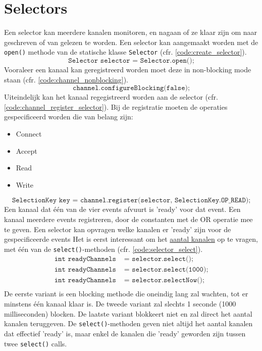 \documentclass{report}
\begin{document}
\section{Selectors}
Een selector kan meerdere kanalen monitoren, en nagaan of ze klaar zijn om naar geschreven of van gelezen te worden. Een selector kan aangemaakt worden met de \texttt{open()} methode van de statische klasse \texttt{Selector} (cfr. \ref{code:create_selector}).
\begin{equation}
	\texttt{Selector selector = Selector.open();}
	\label{code:create_selector}
\end{equation}
Vooraleer een kanaal kan geregistreerd worden moet deze in non-blocking mode staan (cfr. \ref{code:channel_nonblocking}).
\begin{equation}
	\texttt{channel.configureBlocking(false);}
	\label{code:channel_nonblocking}
\end{equation}
Uiteindelijk kan het kanaal regegistreerd worden aan de selector (cfr. \ref{code:channel_register_selector}). Bij de registratie moeten de operaties gespecificeerd worden die van belang zijn:
\begin{itemize}
	\item Connect
	\item Accept
	\item Read
	\item Write
\end{itemize}
\begin{equation}
	\texttt{SelectionKey key = channel.register(selector, SelectionKey.OP\_READ);}
	\label{code:channel_register_selector}
\end{equation}
Een kanaal dat één van de vier events afvuurt is 'ready' voor dat event. Een kanaal meerdere events registreren, door de constanten met de OR operatie mee te geven.
Een selector kan opvragen welke kanalen er 'ready' zijn voor de gespecificeerde events Het is eerst interessant om het \underline{aantal kanalen} op te vragen, met één van de \texttt{select()}-methoden  (cfr. \ref{code:selector_select}).
\begin{equation}
	\begin{split}
		\texttt{int readyChannels} & \texttt{ = selector.select();} \\
		\texttt{int readyChannels} & \texttt{ = selector.select(1000);} \\
		\texttt{int readyChannels} & \texttt{ = selector.selectNow();} \\
	\end{split}
	\label{code:selector_select}
\end{equation}
De eerste variant is een blocking methode die oneindig lang zal wachten, tot er minstens één kanaal klaar is. De tweede variant zal slechts 1 seconde (1000 milliseconden) blocken. De laatste variant blokkeert niet en zal direct het aantal kanalen teruggeven. De \texttt{select()}-methoden geven niet altijd het aantal kanalen dat effectief 'ready' is, maar enkel de kanalen die 'ready' geworden zijn tussen twee \texttt{select()} calls.
\end{document}
